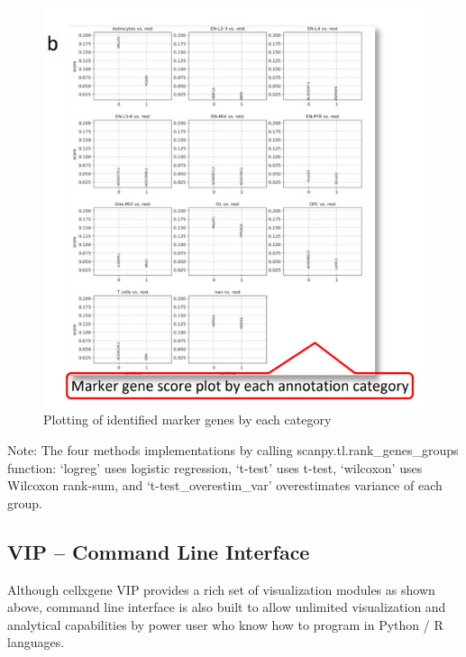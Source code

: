 \documentclass[
]{article}
\begin{document}
\begin{figure}
\centering
\includegraphics{figures/F20B.jpg}
\caption{Plotting of identified marker genes by each category}
\end{figure}

Note: The four methods implementations by calling scanpy.tl.rank\_genes\_groups function: `logreg' uses logistic regression, `t-test' uses t-test, `wilcoxon' uses Wilcoxon rank-sum, and `t-test\_overestim\_var' overestimates variance of each group.

\hypertarget{vip-command-line-interface}{%
\subsection{VIP -- Command Line Interface}\label{vip-command-line-interface}}

Although cellxgene VIP provides a rich set of visualization modules as shown above, command line interface is also built to allow unlimited visualization and analytical capabilities by power user who know how to program in Python / R languages.
\end{document}
